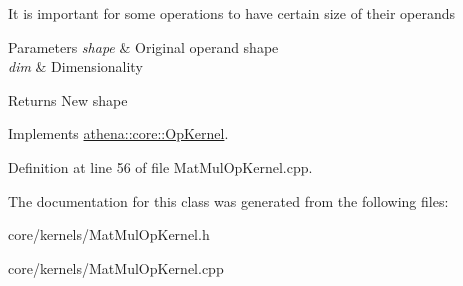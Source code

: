 It is important for some operations to have certain size of their operands 
\begin{DoxyParams}{Parameters}
{\em shape} & Original operand shape \\
\hline
{\em dim} & Dimensionality \\
\hline
\end{DoxyParams}
\begin{DoxyReturn}{Returns}
New shape 
\end{DoxyReturn}


Implements \mbox{\hyperlink{classathena_1_1core_1_1_op_kernel_a762e541463ffd089b47a8e6755c30fe1}{athena\+::core\+::\+Op\+Kernel}}.



Definition at line 56 of file Mat\+Mul\+Op\+Kernel.\+cpp.



The documentation for this class was generated from the following files\+:\begin{DoxyCompactItemize}
\item 
core/kernels/Mat\+Mul\+Op\+Kernel.\+h\item 
core/kernels/Mat\+Mul\+Op\+Kernel.\+cpp\end{DoxyCompactItemize}
